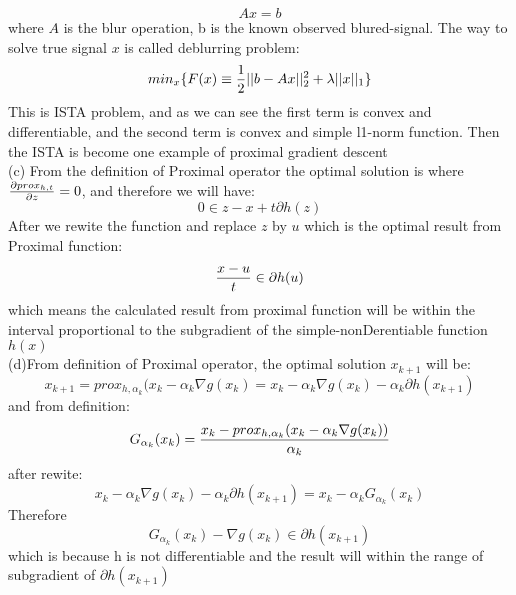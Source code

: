\documentclass{article}
\begin{document}
\begin{equation}
Ax = b
\end{equation}
where $A$ is the blur operation, b is the known observed blured-signal. The way to solve true signal $x$ is called deblurring problem:
\begin{equation}
min_x\{F(x) \equiv {1\over 2}||b-Ax||_2^2 + \lambda||x||_1\}
\end{equation}
This is ISTA problem, and as we can see the first term is convex and differentiable, and the second term is convex and simple l1-norm function. Then the ISTA is become one example of proximal gradient descent\\
(c) From the definition of Proximal operator the optimal solution is where ${\partial prox_{h,t}\over \partial z} = 0$, and therefore we will have:
\begin{equation}
0 \in z-x+t\partial h(z)
\end{equation}
After we rewite the function and replace $z$ by $u$ which is the optimal result from Proximal function:
\begin{equation}
{x-u \over t} \in \partial h(u)
\end{equation}
which means the calculated result from proximal function will be within the interval proportional to the subgradient of the simple-nonDerentiable function $h(x)$\\
(d)From definition of Proximal operator, the optimal solution $x_{k+1}$ will be:
\begin{equation}
x_{k+1} = prox_{h,\alpha_k}(x_k - \alpha_k \nabla g(x_k) = x_k - \alpha_k \nabla g(x_k) - \alpha_k \partial h(x_{k+1})
\end{equation}
and from definition:
\begin{equation}
G_{\alpha_k}(x_k) = { x_k - prox_{h,\alpha_k}(x_k - \alpha_k \nabla g(x_k)) \over \alpha_k}
\end{equation}
after rewite:
\begin{equation}
x_k - \alpha_k \nabla g(x_k) - \alpha_k \partial h(x_{k+1}) = x_k - \alpha_k G_{\alpha_k}(x_k)
\end{equation}
Therefore
\begin{equation}
G_{\alpha_k}(x_k) - \nabla g(x_k) \in \partial h(x_{k+1})
\end{equation}
which is because h is not differentiable and the result will within the range of subgradient of $\partial h(x_{k+1})$
\end{document}
